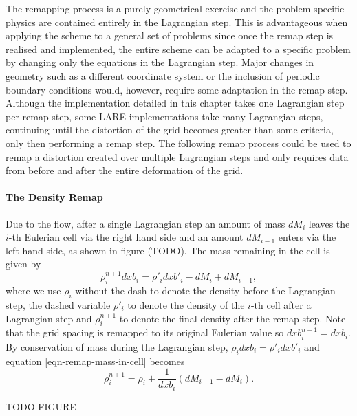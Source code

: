 The remapping process is a purely geometrical exercise and the problem-specific physics are contained entirely in the Lagrangian step. This is advantageous when applying the scheme to a general set of problems since once the remap step is realised and implemented, the entire scheme can be adapted to a specific problem by changing only the equations in the Lagrangian step. Major changes in geometry such as a different coordinate system or the inclusion of periodic boundary conditions would, however, require some adaptation in the remap step. Although the implementation detailed in this chapter takes one Lagrangian step per remap step, some LARE implementations take many Lagrangian steps, continuing until the distortion of the grid becomes greater than some criteria, only then performing a remap step. The following remap process could be used to remap a distortion created over multiple Lagrangian steps and only requires data from before and after the entire deformation of the grid. 

\paragraph{The Density Remap}
Due to the flow, after a single Lagrangian step an amount of mass $dM_i$ leaves the $i$-th Eulerian cell via the right hand side and an amount $dM_{i-1}$ enters via the left hand side, as shown in figure (TODO). The mass remaining in the cell is given by
\begin{equation}
  \rho^{n+1}_i dxb_i = \rho'_i dxb'_i - dM_i + dM_{i-1},
  \label{eqn-remap-mass-in-cell}
\end{equation}
where we use $\rho_i$ without the dash to denote the density before the Lagrangian step, the dashed variable $\rho'_i$ to denote the density of the $i$-th cell after a Lagrangian step and $\rho_i^{n+1}$ to denote the final density after the remap step. Note that the grid spacing is remapped to its original Eulerian value so $dxb^{n+1}_i = dxb_i$. By conservation of mass during the Lagrangian step, $\rho_i dxb_i = \rho'_i dxb'_i$ and equation \eqref{eqn-remap-mass-in-cell} becomes
\begin{equation}
  \rho^{n+1}_i = \rho_i + \frac{1}{dxb_i} (dM_{i-1} - dM_i).
  \label{eqn-remap-density}
\end{equation}

TODO FIGURE

